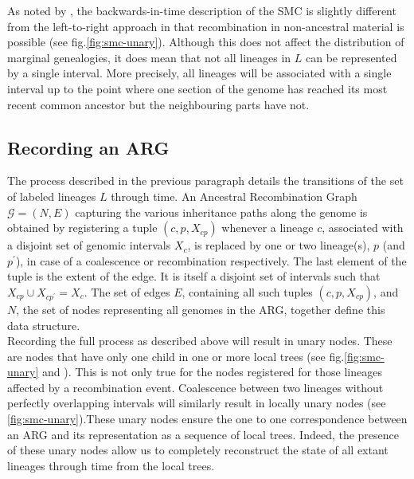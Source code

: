 \documentclass{article}
\begin{document}
As noted by \cite{mcvean_approximating_2005}, the backwards-in-time description of the 
SMC is slightly different from the left-to-right approach in that recombination 
in non-ancestral material is possible (see fig.\ref{fig:smc-unary}). 
Although this does not affect the distribution 
of marginal genealogies, it does mean that not all lineages in $L$ can be represented 
by a single interval. More precisely, all lineages will be associated with 
a single interval up to the point where one section of the 
genome has reached its most recent common ancestor but the neighbouring parts have not.

\subsection{Recording an ARG} \label{par:recording}

The process described in the previous paragraph details the transitions of the 
set of labeled lineages $L$ through time. An Ancestral Recombination Graph 
$\mathcal{G} = (N, E)$ capturing the various inheritance paths along the genome 
is obtained by registering a tuple $(c, p, X_{cp})$ whenever a 
lineage $c$, associated with a disjoint set of genomic intervals $X_c$, is 
replaced by one or two lineage(s), $p$ (and $p^{\prime}$), 
in case of a coalescence or recombination respectively.
The last element of the tuple is the extent of the edge. It is itself a  
disjoint set of intervals such that $X_{cp} \cup X_{cp^{\prime}} = X_c$. 
The set of edges $E$, containing all such tuples $(c, p, X_{cp})$, 
and $N$, the set of nodes representing all genomes in the ARG, together
define this data structure.\\

Recording the full process as described above will result in unary nodes.
These are nodes that have only one child in one or more local trees 
(see fig.\ref{fig:smc-unary} and \citet{Wong-2023}). This is not only true 
for the nodes registered for those lineages affected by a recombination event. 
Coalescence between two lineages without perfectly 
overlapping intervals will similarly result in locally 
unary nodes (see \ref{fig:smc-unary}).These unary nodes ensure the one 
to one correspondence between an ARG and its 
representation as a sequence of local trees. 
Indeed, the presence of these unary nodes allow us to completely reconstruct 
the state of all extant lineages through time from the local trees.\\
\end{document}
